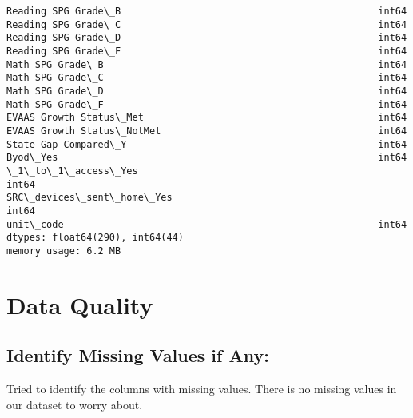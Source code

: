 \documentclass[11pt]{article}
\begin{document}
\begin{Verbatim}[commandchars=\\\{\}]
Reading SPG Grade\_B                                             int64
Reading SPG Grade\_C                                             int64
Reading SPG Grade\_D                                             int64
Reading SPG Grade\_F                                             int64
Math SPG Grade\_B                                                int64
Math SPG Grade\_C                                                int64
Math SPG Grade\_D                                                int64
Math SPG Grade\_F                                                int64
EVAAS Growth Status\_Met                                         int64
EVAAS Growth Status\_NotMet                                      int64
State Gap Compared\_Y                                            int64
Byod\_Yes                                                        int64
\_1\_to\_1\_access\_Yes                                              int64
SRC\_devices\_sent\_home\_Yes                                       int64
unit\_code                                                       int64
dtypes: float64(290), int64(44)
memory usage: 6.2 MB

    \end{Verbatim}

    \section{Data Quality}\label{data-quality}

    \subsection{Identify Missing Values if
Any:}\label{identify-missing-values-if-any}

Tried to identify the columns with missing values. There is no missing
values in our dataset to worry about.
\end{document}
